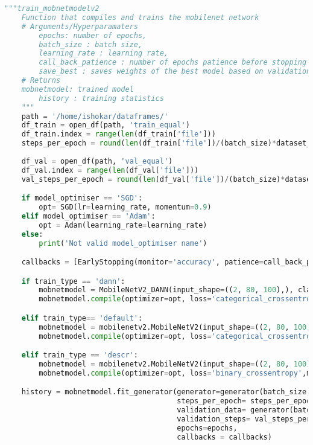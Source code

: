 \begin{lstlisting}[language=Python]
    """train_mobnetmodelv2
    Function that compiles and trains the mobilenet network
    # Arguments/Hyperparamaters
        epochs: number of epochs,
        batch_size : batch size,
        learning_rate : learning rate,
        call_back_patience : number of epochs patience before stopping training if no improvement takes place,
        save_best : saves weights of the best model based on validation loss
    # Returns
	mobnetmodel: trained model
        history : training statistics
    """
    path = '/home/ishokar/dataframes/'
    df_train = open_df(path, 'train_equal')
    df_train.index = range(len(df_train['file']))
    steps_per_epoch = round(len(df_train['file'])/(batch_size)*dataset_percent)
    
    df_val = open_df(path, 'val_equal')
    df_val.index = range(len(df_val['file']))
    val_steps_per_epoch = round(len(df_val['file'])/(batch_size)*dataset_percent)

    if model_optimiser == 'SGD':
        opt= SGD(lr=learning_rate, momentum=0.9)
    elif model_optimiser == 'Adam':
        opt = Adam(learning_rate=learning_rate)
    else:
        print('Not valid model_optimiser name')

    callbacks = [EarlyStopping(monitor='accuracy', patience=call_back_patience)]

    if train_type == 'dann':
        mobnetmodel = MobileNetV2_DANN(input_shape=((2, 80, 100),), classifier_classes=3, descriminator_classes = 2, DANN_strength = DANN_strength)
        mobnetmodel.compile(optimizer=opt, loss='categorical_crossentropy',metrics=['accuracy'])

    elif train_type== 'default':
        mobnetmodel = mobilenetv2.MobileNetV2(input_shape=((2, 80, 100),), classes=3)
        mobnetmodel.compile(optimizer=opt, loss='categorical_crossentropy',metrics=['accuracy'])

    elif train_type == 'descr':
        mobnetmodel = mobilenetv2.MobileNetV2(input_shape=((2, 80, 100),), classes=2)
        mobnetmodel.compile(optimizer=opt, loss='binary_crossentropy',metrics=['accuracy'])

    history = mobnetmodel.fit_generator(generator=generator(batch_size, steps_per_epoch, df_train, model = train_type),
                                        steps_per_epoch= steps_per_epoch,
                                        validation_data= generator(batch_size, val_steps_per_epoch, df_val, model = train_type),
                                        validation_steps= val_steps_per_epoch,
                                        epochs=epochs,
                                        callbacks = callbacks)


\end{lstlisting}
